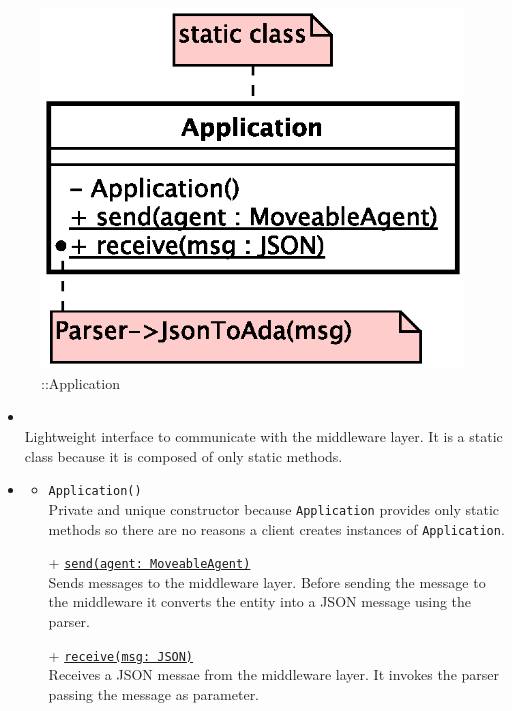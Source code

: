 \begin{figure}[h]
\centering
\includegraphics[scale=0.6,keepaspectratio]{images/solution/app/backend/application.eps}
\caption{\pInterface::Application}
\label{fig:sd-app-application}
\end{figure}
\FloatBarrier
\begin{itemize}
  \item \textbf{\descr} \\
    Lightweight interface to communicate with the middleware layer.
    It is a static class because it is composed of only static methods.
  \item \textbf{\ops}
  \begin{itemize}
   \item \texttt{Application()} \\
   Private and unique constructor because \texttt{Application} provides 
   only static methods so there are no reasons a client creates instances 
   of \texttt{Application}.
    \item[+] \texttt{\underline{send(agent: MoveableAgent)}} \\
    Sends messages to the middleware layer. Before sending the message to the
    middleware it converts the entity into a JSON message using the parser.
    \item[+] \texttt{\underline{receive(msg: JSON)}} \\
    Receives a JSON messae from the middleware layer. It invokes the parser 
    passing the message as parameter.
  \end{itemize}
\end{itemize}
